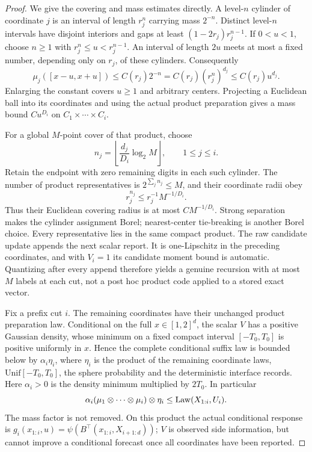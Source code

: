\begin{proof}
We give the covering and mass estimates directly. A level-$n$ cylinder of coordinate $j$ is an interval of length $r_j^n$ carrying mass $2^{-n}$. Distinct level-$n$ intervals have disjoint interiors and gaps at least $(1-2r_j)r_j^{n-1}$. If $0<u<1$, choose $n\ge1$ with $r_j^n\le u<r_j^{n-1}$. An interval of length $2u$ meets at most a fixed number, depending only on $r_j$, of these cylinders. Consequently
\begin{equation}\label{eq:singularball}
 \mu_j([x-u,x+u])\le C(r_j)2^{-n}
                      =C(r_j)(r_j^n)^{d_j}\le C(r_j)u^{d_j}.
\end{equation}
Enlarging the constant covers $u\ge1$ and arbitrary centers. Projecting a Euclidean ball into its coordinates and using the actual product preparation gives a mass bound $C u^{D_i}$ on $C_1\times\cdots\times C_i$.

For a global $M$-point cover of that product, choose
\[
 n_j=\left\lfloor\frac{d_j}{D_i}\log_2 M\right\rfloor,
       \qquad 1\le j\le i.
\]
Retain the endpoint with zero remaining digits in each such cylinder. The number of product representatives is $2^{\sum_j n_j}\le M$, and their coordinate radii obey
\[
 r_j^{n_j}\le r_j^{-1}M^{-1/D_i}.
\]
Thus their Euclidean covering radius is at most $C M^{-1/D_i}$. Strong separation makes the cylinder assignment Borel; nearest-center tie-breaking is another Borel choice. Every representative lies in the same compact product. The raw candidate update appends the next scalar report. It is one-Lipschitz in the preceding coordinates, and with $V_i=1$ its candidate moment bound is automatic. Quantizing after every append therefore yields a genuine recursion with at most $M$ labels at each cut, not a post hoc product code applied to a stored exact vector.

Fix a prefix cut $i$. The remaining coordinates have their unchanged product preparation law. Conditional on the full $x\in[1,2]^d$, the scalar $V$ has a positive Gaussian density, whose minimum on a fixed compact interval $[-T_0,T_0]$ is positive uniformly in $x$. Hence the complete conditional suffix law is bounded below by $\alpha_i\eta_i$, where $\eta_i$ is the product of the remaining coordinate laws, $\mathrm{Unif}[-T_0,T_0]$, the sphere probability and the deterministic interface records. Here $\alpha_i>0$ is the density minimum multiplied by $2T_0$. In particular
\[
 \alpha_i(\mu_1\otimes\cdots\otimes\mu_i)\otimes\eta_i
       \le\operatorname{Law}(X_{1:i},U_i).
\]
The mass factor is not removed. On this product the actual conditional response is
$g_i(x_{1:i},u)=\psi(B^\top(x_{1:i},X_{i+1:d}))$; $V$ is observed side information, but cannot improve a conditional forecast once all coordinates have been reported.


\end{proof}
